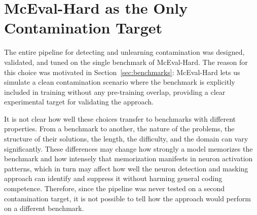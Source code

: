 \documentclass[mscthesis]{usiinfthesis}
\begin{document}
\section{McEval-Hard as the Only Contamination Target}
The entire pipeline for detecting and unlearning contamination was designed, validated, and tuned on the single benchmark of McEval-Hard.
The reason for this choice was motivated in Section~\ref{sec:benchmarks}: McEval-Hard lets us simulate a clean contamination scenario where the benchmark is explicitly included in training without any pre-training overlap, providing a clear experimental target for validating the approach.
\par\vspace{1em}
It is not clear how well these choices transfer to benchmarks with different properties.
From a benchmark to another, the nature of the problems, the structure of their solutions, the length, the difficulty, and the domain can vary significantly.
These differences may change how strongly a model memorizes the benchmark and how intensely that memorization manifests in neuron activation patterns, which in turn may affect how well the neuron detection and masking approach can identify and suppress it without harming general coding competence.
Therefore, since the pipeline was never tested on a second contamination target, it is not possible to tell how the approach would perform on a different benchmark.
\end{document}
